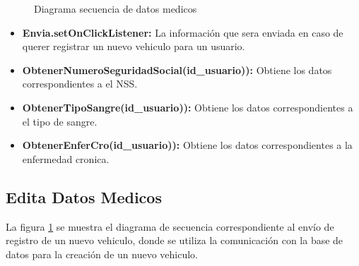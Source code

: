 \begin{figure}[htbp!]
	\centering
	\caption{Diagrama secuencia de datos medicos}
	\label{fig:ObtenerDatosMedicos}
\end{figure}
\begin{itemize}
	\item \textbf{Envia.setOnClickListener:} La información que sera enviada en caso de querer registrar un nuevo vehiculo para un usuario.
	\item \textbf{ObtenerNumeroSeguridadSocial(id_usuario)):} Obtiene los datos correspondientes a el NSS.
	\item \textbf{ObtenerTipoSangre(id_usuario)):} Obtiene los datos correspondientes a el tipo de sangre.
	\item \textbf{ObtenerEnferCro(id_usuario)):} Obtiene los datos correspondientes a la enfermedad cronica.
	

\end{itemize}

\subsection{Edita Datos Medicos}

La figura \ref{fig:ObtenerDatosMedicos} se muestra el diagrama de secuencia correspondiente al envío de registro de un nuevo vehiculo, donde se utiliza la comunicación con la base de datos para la creación de un nuevo vehiculo.

